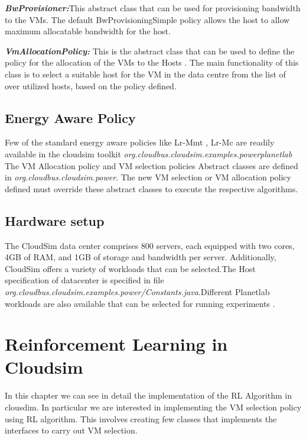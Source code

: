 \documentclass[a4paper,12pt]{Classes/RoboticsLaTeX}
\begin{document}
       \textit{\textbf{BwProvisioner:}}This  abstract class that can be used for provisioning bandwidth to the VMs. The default BwProvisioningSimple policy allows the host to allow maximum allocatable bandwidth for the host.

       \textbf{\textit{VmAllocationPolicy:}} This is the abstract class that can be used to define the policy for the allocation of the VMs to the Hosts . The main functionality of this class is to select a suitable host for the VM in the data centre from the list of over utilized hosts, based on the policy defined. 

       \section{Energy Aware Policy}
       Few of the standard energy aware policies like Lr-Mmt , Lr-Mc are readily available in the cloudsim toolkit \textit{org.cloudbus.cloudsim.examples.powerplanetlab } The VM Allocation policy and VM selection policies Abstract classes are defined in \textit{org.cloudbus.cloudsim.power}. The new VM selection or VM allocation policy defined must override these abstract classes to execute the respective algorithms.

       \section{Hardware setup }

       The CloudSim data center comprises 800 servers, each equipped with two cores, 4GB of RAM, and 1GB of storage and bandwidth per server. Additionally, CloudSim offers a variety of workloads that can be selected.The Host specification of datacenter  is specified  in file  \textit{org.cloudbus.cloudsim.examples.power/Constants.java}.Different Planetlab workloads are  also available that can be selected for running experiments .

       \chapter{Reinforcement Learning in Cloudsim}
       \label{chap:RL in Cloudsim}

       In this chapter we can see in detail the implementation of the RL Algorithm in clousdim. In particular we are interested in implementing the  VM selection policy using RL algorithm. This involves creating few classes that implements the interfaces to carry out VM selection.
\end{document}
